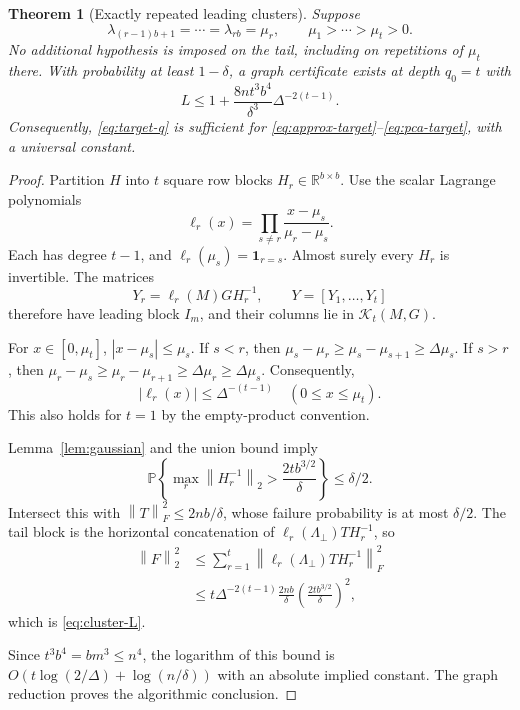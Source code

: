 \documentclass[11pt]{article}
\newtheorem{theorem}{Theorem}[section]
\theoremstyle{definition}
\newcommand{\R}{\mathbb R}
\newcommand{\Prob}{\mathbb P}
\newcommand{\K}{\mathcal K}
\newcommand{\norm}[1]{\left\lVert #1\right\rVert}
\begin{document}
\begin{theorem}[Exactly repeated leading clusters]
\label{thm:clusters}
Suppose
\begin{equation}
 \lambda_{(r-1)b+1}=\cdots=\lambda_{rb}=\mu_r,
 \qquad \mu_1>\cdots>\mu_t>0.
 \label{eq:exactclusters}
\end{equation}
No additional hypothesis is imposed on the tail, including on repetitions
of $\mu_t$ there. With probability at least $1-\delta$, a graph certificate
exists at depth $q_0=t$ with
\begin{equation}
 L\leq1+\frac{8nt^3b^4}{\delta^3}
                  \Delta^{-2(t-1)}.
 \label{eq:cluster-L}
\end{equation}
Consequently, \eqref{eq:target-q} is sufficient for
\eqref{eq:approx-target}--\eqref{eq:pca-target}, with a universal constant.
\end{theorem}
\begin{proof}
Partition $H$ into $t$ square row blocks $H_r\in\R^{b\times b}$.
Use the scalar Lagrange polynomials
\[
 \ell_r(x)=\prod_{s\ne r}\frac{x-\mu_s}{\mu_r-\mu_s}.
\]
Each has degree $t-1$, and $\ell_r(\mu_s)=\mathbf1_{r=s}$.
Almost surely every $H_r$ is invertible. The matrices
\[
 Y_r=\ell_r(M)GH_r^{-1},\qquad
 Y=[Y_1,\ldots,Y_t]
\]
therefore have leading block $I_m$, and their columns lie in
$\K_t(M,G)$.

For $x\in[0,\mu_t]$, $|x-\mu_s|\leq\mu_s$.
If $s<r$, then
$\mu_s-\mu_r\geq\mu_s-\mu_{s+1}\geq\Delta\mu_s$.
If $s>r$, then
$\mu_r-\mu_s\geq\mu_r-\mu_{r+1}\geq\Delta\mu_r\geq\Delta\mu_s$.
Consequently,
\begin{equation}
 |\ell_r(x)|\leq\Delta^{-(t-1)}
 \quad(0\leq x\leq\mu_t).
 \label{eq:cluster-lagrange}
\end{equation}
This also holds for $t=1$ by the empty-product convention.

Lemma~\ref{lem:gaussian} and the union bound imply
\[
 \Prob\left\{\max_r\norm{H_r^{-1}}_2>
                      \frac{2tb^{3/2}}{\delta}\right\}\leq\delta/2.
\]
Intersect this with $\norm{T}_F^2\leq2nb/\delta$, whose failure probability
is at most $\delta/2$. The tail block is the horizontal concatenation of
$\ell_r(\Lambda_\perp)TH_r^{-1}$, so
\begin{align*}
 \norm{F}_2^2
 &\leq\sum_{r=1}^t\norm{\ell_r(\Lambda_\perp)TH_r^{-1}}_F^2\\
 &\leq t\Delta^{-2(t-1)}\frac{2nb}{\delta}
                           \left(\frac{2tb^{3/2}}{\delta}\right)^2,
\end{align*}
which is \eqref{eq:cluster-L}.

Since $t^3b^4=bm^3\leq n^4$, the logarithm of this bound is
$O(t\log(2/\Delta)+\log(n/\delta))$ with an absolute implied constant.
The graph reduction proves the algorithmic conclusion.
\end{proof}
\end{document}
